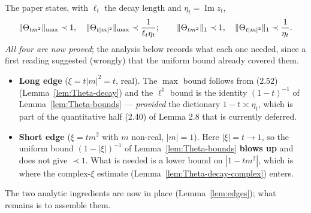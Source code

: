 \begin{lemma}\label{lem:3.35}
  \leanok{}
  The paper states, with $\ell_t$ the decay length and $\eta_t = \operatorname{Im} z_t$,
  \[ \|\Theta_{tm^2}\|_{\max} \prec 1, \quad \|\Theta_{t|m|^2}\|_{\max} \prec \frac1{\ell_t\eta_t};
     \qquad
     \|\Theta_{tm^2}\|_{1} \prec 1, \quad \|\Theta_{t|m|^2}\|_{1} \prec \frac1{\eta_t} . \]
  \emph{All four are now proved}; the analysis below records what each one needed, since a
  first reading suggested (wrongly) that the uniform bound already covered them.
  \begin{itemize}
    \item \textbf{Long edge} ($\xi = t|m|^2 = t$, real).  The $\max$ bound follows from
      (2.52) (Lemma~\ref{lem:Theta-decay}) and the $\ell^1$ bound is the identity
      $(1-t)^{-1}$ of Lemma~\ref{lem:Theta-bounds} --- \emph{provided} the dictionary
      $1-t \asymp \eta_t$, which is part of the quantitative half (2.40) of Lemma 2.8
      that is currently deferred.
    \item \textbf{Short edge} ($\xi = tm^2$ with $m$ non-real, $|m| = 1$).  Here
      $|\xi| = t \to 1$, so the uniform bound $(1-|\xi|)^{-1}$ of
      Lemma~\ref{lem:Theta-bounds} \textbf{blows up} and does not give $\prec 1$.  What is
      needed is a lower bound on $|1-tm^2|$, which is where the complex-$\xi$ estimate
      (Lemma~\ref{lem:Theta-decay-complex}) enters.
  \end{itemize}
  The two analytic ingredients are now in place (Lemma~\ref{lem:edges}); what remains is
  to assemble them.
\end{lemma}

